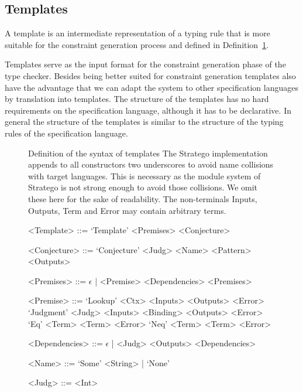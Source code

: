 \subsection{Templates}
A template is an intermediate representation of a typing rule that is
more suitable for the constraint generation process and defined in
Definition~\ref{def:template}.

Templates serve as the input format for the constraint generation
phase of the type checker. Besides being better suited for constraint
generation templates also have the advantage that we can adapt the
system to other specification languages by translation into
templates. The structure of the templates has no hard requirements on
the specification language, although it has to be declarative. In
general the structure of the templates is similar to the structure of
the typing rules of the specification language.

\begin{figure}
\begin{definition}{Definition of the syntax of templates}
  The Stratego implementation appends to all constructors two
  underscores to avoid name collisions with target languages. This is
  necessary as the module system of Stratego is not strong enough to
  avoid those collisions. We omit these here for the sake of
  readability. The non-terminals Inputs, Outputs, Term and Error may
  contain arbitrary terms.
  \begin{grammar}
    <Template> ::= `Template' <Premises> <Conjecture>

    <Conjecture> ::= `Conjecture' <Judg> <Name> <Pattern> <Outputs>

    <Premises> ::= $\epsilon$ | <Premise> <Dependencies> <Premises>

    <Premise> ::= `Lookup' <Ctx> <Inputs> <Outputs> <Error>
    \alt `Judgment' <Judg> <Inputs> <Binding> <Outputs> <Error>
    \alt `Eq' <Term> <Term> <Error>
    \alt `Neq' <Term> <Term> <Error>

    <Dependencies> ::= $\epsilon$ | <Judg> <Outputs> <Dependencies>

    <Name> ::= `Some' <String> | `None'

    <Judg> ::= <Int>
  \end{grammar}
\label{def:template}
\end{definition}
\end{figure}


